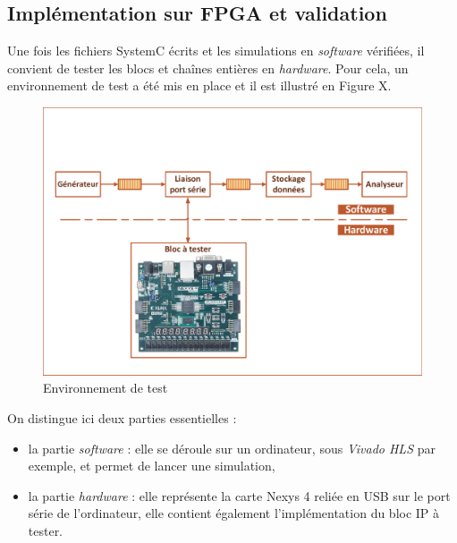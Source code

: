 \documentclass[a4paper,12pt]{article}
\begin{document}
\subsection{Implémentation sur FPGA et validation}
	Une fois les fichiers SystemC écrits et les simulations en \textit{software} vérifiées, il convient de tester les blocs et chaînes entières en \textit{hardware}. Pour cela, un environnement de test a été mis en place et il est illustré en Figure X.
	\begin{figure}[H]
		\centering
		\includegraphics[width=\textwidth, keepaspectratio]{Dessin6.pdf}
		\caption{Environnement de test}
	\end{figure}
	\noindent On distingue ici deux parties essentielles :\\
	\begin{itemize}
		\item[\textbullet] la partie \textit{software} : elle se déroule sur un ordinateur, sous \textit{Vivado HLS} par exemple, et permet de lancer une simulation,\\
		\item[\textbullet] la partie \textit{hardware} : elle représente la carte Nexys 4 reliée en USB sur le port série de l'ordinateur, elle contient également l'implémentation du bloc IP à tester.\\
	\end{itemize}
\end{document}
